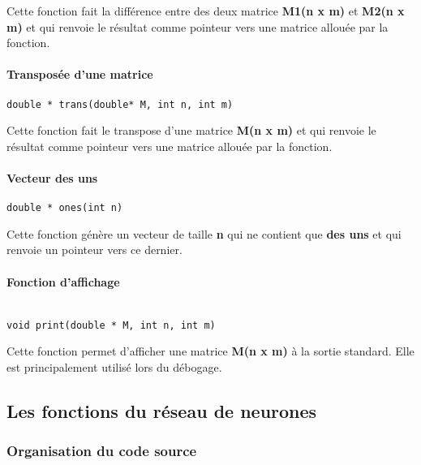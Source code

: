 Cette fonction fait la différence entre des deux matrice \textbf{M1(n x m)} et \textbf{M2(n x m)} et qui renvoie le résultat comme pointeur vers une matrice allouée par la fonction.


\paragraph{Transposée d'une matrice}
\begin{verbatim}
double * trans(double* M, int n, int m)
\end{verbatim}

Cette fonction fait le transpose d'une matrice \textbf{M(n x m)} et qui renvoie le résultat comme pointeur vers une matrice allouée par la fonction.

\paragraph{Vecteur des uns}
\begin{verbatim}
double * ones(int n)
\end{verbatim}

Cette fonction génère un vecteur de taille \textbf{n} qui ne contient que \textbf{des uns} et qui renvoie un pointeur vers ce dernier.


\paragraph{Fonction d'affichage}
\begin{verbatim}

void print(double * M, int n, int m)
\end{verbatim}

Cette fonction permet d'afficher une matrice \textbf{M(n x m)} à la sortie standard. Elle est principalement utilisé lors du débogage.

\subsection{Les fonctions du réseau de neurones}

\subsubsection{Organisation du code source}

